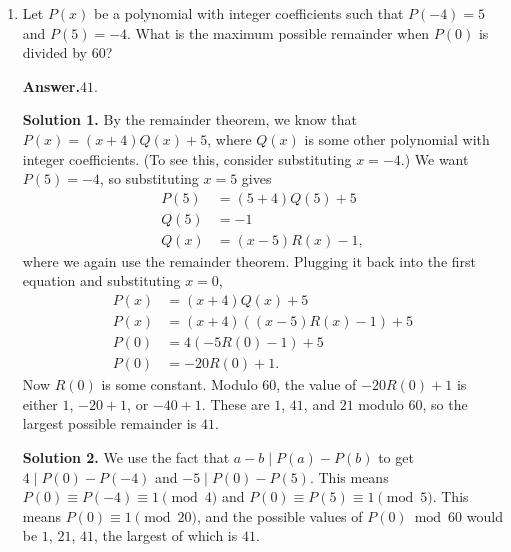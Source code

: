 \documentclass[11pt,paper=letter]{scrartcl}
\newcommand{\ans}[1]{{\sffamily \bfseries Answer.}\;\(\boxed{\text{#1}}\).}
\newcommand{\sol}{{\sffamily \bfseries Solution.}\;}
\newcommand{\soln}[1]{{\sffamily \bfseries Solution #1.}\;}
\begin{document}
\begin{enumerate}[align=left,leftmargin=*,resume]
\ans{$4644$}

\sol The number of integers at most $n$ that are divisible by $2$ is $\floor{\frac{n}{2}}$, and similarly, the number divisible by $23$ is $\floor{\frac{n}{23}}$. But this double-counts the numbers divisible by both. To not count those numbers, we can subtract $2\floor{\frac{n}{46}}$. So we're looking for the smallest $n$ such that \[
  \floor{\frac{n}{2}} + \floor{\frac{n}{23}} - 2\floor{\frac{n}{46}} = 2323.
\]
Let's over-estimate $n$ and then go down bit-by-bit until we find the right one. $\floor{x}$ is always at most $x$, so we want $\frac{n}{2} + \frac{n}{23} - \frac{2n}{46} \le 2323$, which solves to $n \le 4646$. Plugging into the original equation, we see that $4646$ works, but is it the smallest? We can check that $4645$ and $4644$ both work, but $4643$ gives $2322$, which is too small. So the answer must be $4644$.

\item Let $P(x)$ be a polynomial with integer coefficients such that $P(-4) = 5$ and $P(5) = -4$. What is the maximum possible remainder when $P(0)$ is divided by $60$?

\ans{$41$}

\soln1 By the remainder theorem, we know that $P(x) = (x + 4)Q(x) + 5$, where $Q(x)$ is some other polynomial with integer coefficients. (To see this, consider substituting $x = -4$.) We want $P(5) = -4$, so substituting $x = 5$ gives 
\begin{align*}
P(5) &= (5 + 4)Q(5) + 5 \\
Q(5) &= -1 \\
Q(x) &= (x - 5)R(x) - 1,
\end{align*}
where we again use the remainder theorem. Plugging it back into the first equation and substituting $x = 0$,
\begin{align*}
P(x) &= (x + 4)Q(x) + 5 \\
P(x) &= (x + 4)\left( (x - 5)R(x) - 1 \right) + 5 \\
P(0) &= 4\left(-5R(0)-1\right) + 5 \\
P(0) &= -20R(0)+1.
\end{align*}
Now $R(0)$ is some constant. Modulo $60$, the value of $-20R(0) + 1$ is either $1$, $-20 + 1$, or $-40 + 1$. These are $1$, $41$, and $21$ modulo $60$, so the largest possible remainder is $41$.

\soln2 We use the fact that $a - b \mid P(a) - P(b)$ to get $4 \mid P(0) - P(-4)$ and $-5 \mid P(0) - P(5)$. This means $P(0) \equiv P(-4) \equiv 1 \pmod 4$ and $P(0) \equiv P(5) \equiv 1 \pmod 5$. This means $P(0) \equiv 1 \pmod{20}$, and the possible values of $P(0) \bmod{60}$ would be $1$, $21$, $41$, the largest of which is $41$.


\end{enumerate}
\end{document}
